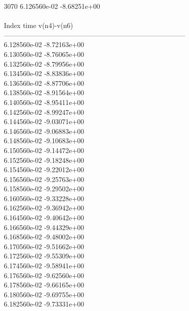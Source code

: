 3070	6.126560e-02	-8.68251e+00	\\ \hline
\\ \hline
Index   time            v(n4)-v(n6)     \\ \hline
--------------------------------------------------------------------------------\\ 	6.128560e-02	-8.72163e+00	\\ 	6.130560e-02	-8.76065e+00	\\ 	6.132560e-02	-8.79956e+00	\\ 	6.134560e-02	-8.83836e+00	\\ 	6.136560e-02	-8.87706e+00	\\ 	6.138560e-02	-8.91564e+00	\\ 	6.140560e-02	-8.95411e+00	\\ 	6.142560e-02	-8.99247e+00	\\ 	6.144560e-02	-9.03071e+00	\\ 	6.146560e-02	-9.06883e+00	\\ 	6.148560e-02	-9.10683e+00	\\ 	6.150560e-02	-9.14472e+00	\\ 	6.152560e-02	-9.18248e+00	\\ 	6.154560e-02	-9.22012e+00	\\ 	6.156560e-02	-9.25763e+00	\\ 	6.158560e-02	-9.29502e+00	\\ 	6.160560e-02	-9.33228e+00	\\ 	6.162560e-02	-9.36942e+00	\\ 	6.164560e-02	-9.40642e+00	\\ 	6.166560e-02	-9.44329e+00	\\ 	6.168560e-02	-9.48002e+00	\\ 	6.170560e-02	-9.51662e+00	\\ 	6.172560e-02	-9.55309e+00	\\ 	6.174560e-02	-9.58941e+00	\\ 	6.176560e-02	-9.62560e+00	\\ 	6.178560e-02	-9.66165e+00	\\ 	6.180560e-02	-9.69755e+00	\\ 	6.182560e-02	-9.73331e+00	\\ \hline
